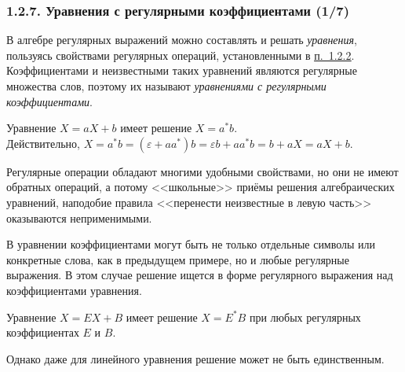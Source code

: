 \documentclass[mathserif,12pt,aspectratio=169]{beamer}
\def\emразделенной{\em разделенной}
\renewcommand{\index}[1]{}
\def\em#1{\it\color{blue}#1}
\def\odmkey#1#2{{\it\color{red} #1}\index{#2}}
\def\DMref#1#2{{\color{blue}\underline{\hyperlink{#2}{#1}}}}
\begin{document}
\begin{frame}
\frametitle{1.2.7. Уравнения с регулярными коэффициентами (1/7)}
В алгебре регулярных выражений можно 
составлять и решать {\em уравнения}, пользуясь 
свойствами регулярных операций, установленными
в \DMref{п.~1.2.2}{1.2.2.}.
Коэффициентами и неизвестными таких
уравнений являются регулярные множества 
слов, поэтому их называют
\odmkey{уравнениями с  регулярными коэффициентами}{Уравнение!с регулярными коэффициентами}.

\begin{example}
Уравнение $X=aX+b$ имеет решение $X=a^*b$.\\
Действительно, $X=a^*b=(\varepsilon+aa^*)b
=\varepsilon b +aa^*b = b+aX=aX+b$.
\end{example}

\begin{digress}
Регулярные операции обладают многими 
удобными свойствами, но они не имеют
обратных операций, 
а потому <<школьные>> приёмы
решения алгебраических уравнений,
наподобие правила 
<<перенести неизвестные в левую часть>>
оказываются неприменимыми.
\end{digress}

В уравнении коэффициентами могут 
быть не только отдельные символы или конкретные слова,
как в предыдущем примере, 
но и любые регулярные выражения.
В этом случае решение ищется в форме
регулярного выражения над коэффициентами
уравнения.

\begin{example}
Уравнение $X=EX+B$ имеет решение $X=E^*B$
при любых регулярных коэффициентах $E$ и $B$.
\end{example} 

Однако даже для линейного уравнения решение
может не быть единственным.
\end{frame}
\end{document}
